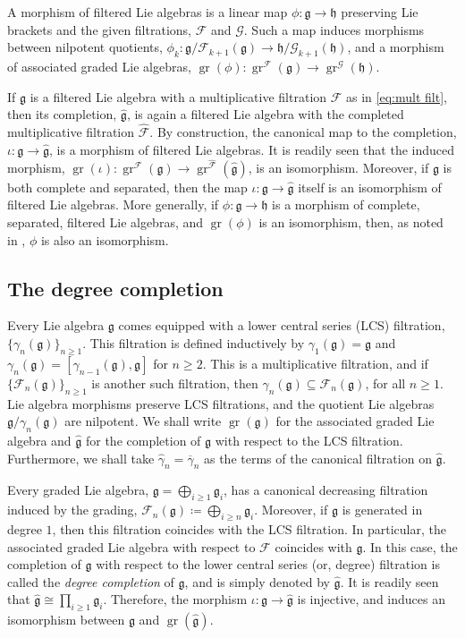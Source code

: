 \documentclass{article}
\numberwithin{equation}{section}
\theoremstyle{definition}
\newcommand{\F}{\mathcal{F}}
\newcommand{\cG}{\mathcal{G}}
\newcommand{\g}{{\mathfrak{g}}}
\newcommand{\h}{{\mathfrak{h}}}
\DeclareMathOperator{\gr}{gr}
\begin{document}
A morphism of filtered Lie algebras is a linear map 
$\phi\colon \g\to \h$ preserving Lie brackets and the 
given filtrations, $\F$ and $\mathcal{G}$. Such a map  
induces morphisms between  nilpotent quotients, 
$\phi_k\colon \g/\F_{k+1}(\g) \to \h/\cG_{k+1} (\h)$, and 
a morphism of associated graded Lie algebras, 
$\gr(\phi)\colon \gr^{\F}(\g)\rightarrow \gr^{\cG}(\h)$. 

If $\g$ is a filtered Lie algebra with a multiplicative filtration 
$\F$ as in \eqref{eq:mult filt}, then its completion, $\widehat{\g}$, 
is again a filtered Lie algebra with the completed multiplicative filtration $\widehat{\F}$. 
By construction, the canonical map to the completion, $\iota\colon \g\to \widehat{\g}$, 
is a morphism of filtered Lie algebras.  It is readily seen that the induced 
morphism, $\gr(\iota)\colon \gr^{\F}(\g) \to \gr^{\widehat{\F}}(\widehat{\g})$, 
is an isomorphism.  Moreover, if $\g$ is both complete 
and separated, then the map $\iota\colon \g\to \widehat{\g}$ itself is 
an isomorphism of filtered Lie algebras. 
More generally, if $\phi\colon \g\to \h$ is a morphism of complete, separated, 
filtered Lie algebras, and $\gr(\phi)$ is an isomorphism, then, as noted in 
\cite[Lemma 2.1]{SW-forum}, $\phi$ is also an isomorphism.

\subsection{The degree completion}
\label{subsec:deg completion}
Every Lie algebra $\g$ comes equipped with a lower central series (LCS) 
filtration, $\{\gamma_{n}(\g)\}_{n\ge 1}$. This filtration is defined inductively 
by $\gamma_1(\g)=\g$ and $\gamma_{n}(\g)=[\gamma_{n-1}(\g),\g]$ for $n\ge 2$.  
This is a multiplicative filtration, and 
if $\{\F_{n}(\g)\}_{n\ge 1}$ is another such filtration, then
$\gamma_{n} (\g)\subseteq \F_{n} (\g)$, for all $n\ge 1$.
Lie algebra morphisms preserve LCS filtrations,  
and the quotient Lie algebras $\g/\gamma_{n} (\g)$ are nilpotent. 
We shall write $\gr(\g)$ for the associated graded Lie algebra 
and $\widehat{\g}$ for the completion of $\g$ with respect to the 
LCS filtration.  Furthermore, we shall take 
$\widehat{\gamma}_{n}=\overline{\gamma}_{n}$ as 
the terms of the canonical filtration on $\widehat{\g}$.

Every graded Lie algebra, $\g=\bigoplus_{i\ge 1} \g_i$, has 
a canonical decreasing filtration induced by the grading, 
$\F_{n} (\g) \coloneqq \bigoplus_{i\ge n} \g_i$. 
Moreover, if $\g$ is generated in degree $1$, then 
this filtration coincides with the LCS filtration. 
In particular, the associated graded Lie algebra with respect to $\F$  
coincides with $\g$. In this case, the completion of $\g$ with respect 
to the lower central series (or, degree) filtration is called the 
{\em degree completion}\/ of $\g$, and is simply denoted by 
$\widehat{\g}$.  It is readily seen that $\widehat{\g}\cong \prod_{i\ge 1} \g_i$.  
Therefore, the morphism $\iota\colon \g\to \widehat{\g}$ is injective, 
and induces an isomorphism between $\g$ and 
$\gr( \widehat{\g} )$.  
\end{document}
